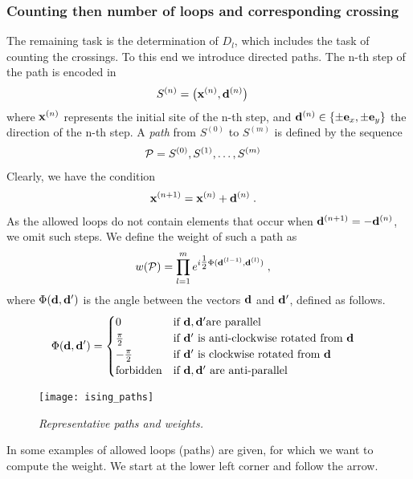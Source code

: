  \subsubsection{Counting then number of loops and corresponding crossing}
The remaining task is the determination of $D_{l}$, which includes the task of counting the crossings. To this end we introduce directed paths. The n-th step of the path is encoded in
%
\begin{align}
S^{(n)} &=\big( \mathbf x^{(n)}, \mathbf d ^{(n)}\big)\,
\end{align}
%
where $\mathbf x^{(n)}$ represents the initial site of the n-th step, 
and $\mathbf d^{(n)}\in\{\pm\mathbf e_{x},\pm\mathbf e_{y}\}$ 
the direction of the n-th step.  
A {\em path} from $S^{(0)}$ to $S^{(m)}$ is defined by the sequence
%
\begin{align*}
{\cal P}&=S^{(0)},S^{(1)},\ldots,S^{(m)}
\end{align*}
%
Clearly, we have the condition
%
\begin{align}\label{eq:ising:path:cond}
\mathbf x^{(n+1)} &=\mathbf x^{(n)} + \mathbf d^{(n)}\;.
\end{align}
%
As the allowed loops do not contain elements that occur when $\mathbf d^{(n+1)}=-\mathbf d^{(n)}$,
we omit such steps. We define the weight of such a path as
%
\begin{align}
w ({\cal P}) &= \prod_{l=1}^{m}e^{i \tfrac{1}{2}\Phi(\mathbf d^{(l-1)},\mathbf d^{(l)})}\;,
\end{align}
%
where $\Phi(\mathbf d, \mathbf d')$ is the angle between the vectors $\mathbf d$ and $\mathbf d'$, defined as follows.
%
\begin{align}\label{eq:}
\Phi(\mathbf d,\mathbf d') &=
\begin{cases}
	0&\text{if } \mathbf d , \mathbf d' \text{are parallel}\\
	\frac{\pi}{2}&\text{if } \mathbf d' \text{ is anti-clockwise rotated from } \mathbf d\\
		-\frac{\pi}{2}&\text{if } \mathbf d' \text{ is clockwise rotated from } \mathbf d\\
		\text{forbidden}&\text{if } \mathbf d , \mathbf d' \text{ are anti-parallel}
\end{cases}
\end{align}
%
\begin{figure}[t]
\texttt{[image: ising\_paths]}
\caption{{\it Representative paths and weights.}\label{fig:ising:paths}}
\end{figure}
%
In  some examples of allowed loops (paths) are given, for which we want to compute the weight. We start at the lower left corner and follow the arrow. 
